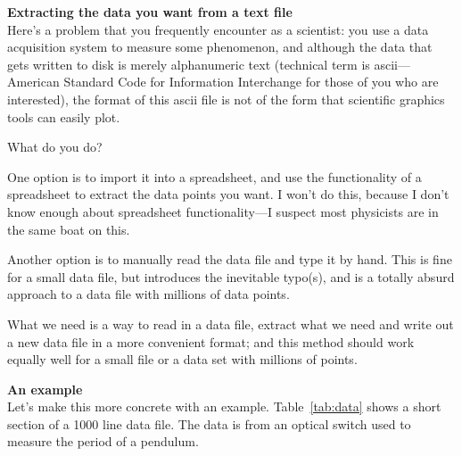\begin{prob}
\label{prob:extractingData}
\textbf{\large Extracting the data you want from a text file}\\
Here's a problem that you frequently encounter as a scientist: you use a data acquisition system to measure some phenomenon, and although the data that gets written to disk is merely alphanumeric text (technical term is ascii---American Standard Code for Information Interchange for those of you who are interested), the format of this ascii file is not of the form that scientific graphics tools can easily plot.

What do you do? 

One option is to import it into a spreadsheet, and use the functionality of a spreadsheet to extract the data points you want. I won't do this, because I don't know enough about spreadsheet functionality---I suspect most physicists are in the same boat on this. 

Another option is to manually read the data file and type it by hand. This is fine for a small data file, but introduces the inevitable typo(s), and is a totally absurd approach to a data file with millions of data points. 

What we need is a way to read in a data file, extract what we need and write out a new data file in a more convenient format; and this method should work equally well for a small file or a data set with millions of points.\\

\pagebreak

\noindent\textbf{\large An example}\\[2mm]
Let's make this more concrete with an example. Table~\ref{tab:data} shows a short section of a 1000 line data file. The data is from an optical switch used to measure the period of a pendulum. 


\end{prob}
